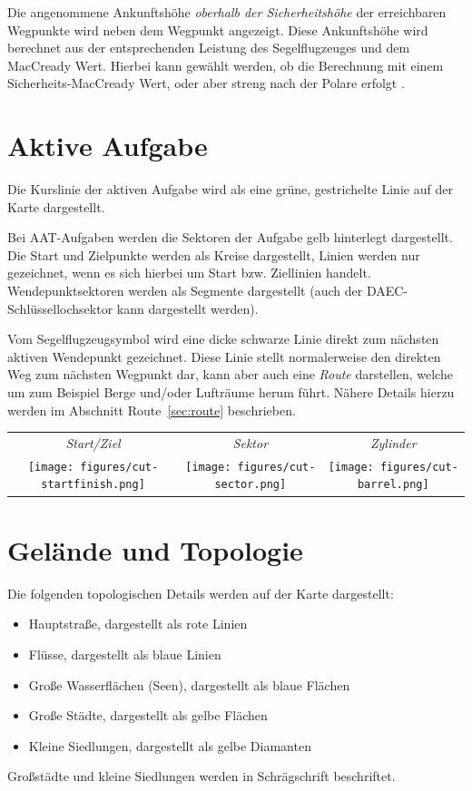 Die angenommene Ankunftshöhe {\em oberhalb der Sicherheitshöhe} der erreichbaren  Wegpunkte wird neben dem Wegpunkt  angezeigt. Diese Ankunftshöhe wird berechnet aus der entsprechenden Leistung des Segelflugzeuges und dem MacCready Wert. Hierbei kann gewählt werden, ob die Berechnung mit einem Sicherheits-MacCready Wert, oder aber streng nach der Polare erfolgt .
\section{Aktive Aufgabe}
Die Kurslinie der aktiven Aufgabe wird als eine grüne, gestrichelte Linie auf der Karte dargestellt.

Bei AAT-Aufgaben werden die Sektoren der Aufgabe gelb hinterlegt dargestellt.
Die Start und Zielpunkte werden als Kreise dargestellt, Linien werden nur gezeichnet, wenn es sich hierbei um Start bzw. Ziellinien handelt.
Wendepunktsektoren werden als Segmente dargestellt (auch der DAEC-Schlüssellochsektor kann dargestellt werden).

Vom Segelflugzeugsymbol wird eine dicke schwarze Linie direkt zum nächsten aktiven Wendepunkt gezeichnet. Diese Linie stellt normalerweise den direkten Weg zum nächsten Wegpunkt dar, kann aber auch eine {\em Route} darstellen, welche um zum Beispiel Berge und/oder Lufträume herum führt. Nähere Details hierzu werden im Abschnitt Route~\ref{sec:route}  beschrieben.
\begin{center}
\begin{tabular}{c c c}
{\it Start/Ziel} & {\it Sektor} & {\it Zylinder} \\
\texttt{[image: figures/cut-startfinish.png]} &
\texttt{[image: figures/cut-sector.png]} &
\texttt{[image: figures/cut-barrel.png]} \\
\end{tabular}
\end{center}
\section{Gelände und Topologie}

Die folgenden topologischen Details werden auf der Karte dargestellt:
\begin{itemize}
\item Hauptstraße, dargestellt als rote Linien
\item Flüsse, dargestellt als blaue Linien
\item Große Wasserflächen (Seen), dargestellt als blaue Flächen
\item Große Städte, dargestellt als gelbe Flächen
\item Kleine Siedlungen, dargestellt als gelbe Diamanten
\end{itemize}
Großstädte und kleine Siedlungen werden in Schrägschrift beschriftet.


